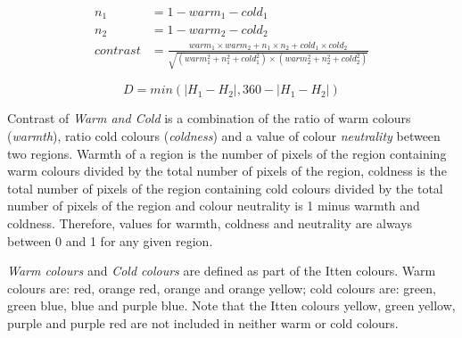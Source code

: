 \documentclass[11pt,a4paper,twoside,openright]{report}
\begin{document}
\begin{figure}[!htb]
\begin{equation}
\begin{aligned}
n_1       &= 1 - warm_1 - cold_1 \\
n_2       &= 1 - warm_2 - cold_2 \\
contrast  &= \frac{ warm_1 \times warm_2
                   + n_1    \times n_2
                   + cold_1 \times cold_2
                  }{ \sqrt{      (warm_1^2 + n_1^2 + cold_1^2)
                          \times (warm_2^2 + n_2^2 + cold_2^2) } }
\label{eq:mach}
\end{aligned}
\end{equation}
\end{figure}

\begin{figure}[!htb]
\begin{equation}
D = min( \lvert H_1 - H_2 \rvert , 360 - \lvert H_1 - H_2 \rvert )
\label{eq:wheel}
\end{equation}
\end{figure}

Contrast of \emph{Warm and Cold} is a combination of the ratio of warm colours
(\emph{warmth}), ratio cold colours (\emph{coldness}) and a value of colour
\emph{neutrality} between two regions.  Warmth of a region is the number of
pixels of the region containing warm colours divided by the total number of
pixels of the region, coldness is the total number of pixels of the region
containing cold colours divided by the total number of pixels of the region and
colour neutrality is 1 minus warmth and coldness.  Therefore, values for
warmth, coldness and neutrality are always between 0 and 1 for any given
region.

\emph{Warm colours} and \emph{Cold colours} are defined as part of the Itten
colours.  Warm colours are: red, orange red, orange and orange yellow; cold
colours are: green, green blue, blue and purple blue.  Note that the Itten
colours yellow, green yellow, purple and purple red are not included in neither
warm or cold colours.
\end{document}
